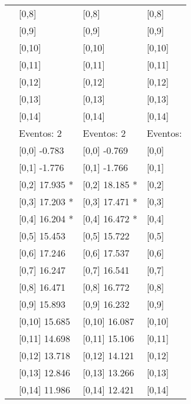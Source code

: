 \begin{table}
\begin{tabular}[t]{llll}
\addlinespace
 & {}[0,8] & {}[0,8] & {}[0,8]\\
 & {}[0,9] & {}[0,9] & {}[0,9]\\
 & {}[0,10] & {}[0,10] & {}[0,10]\\
 & {}[0,11] & {}[0,11] & {}[0,11]\\
 & {}[0,12] & {}[0,12] & {}[0,12]\\
\addlinespace
 & {}[0,13] & {}[0,13] & {}[0,13]\\
 & {}[0,14] & {}[0,14] & {}[0,14]\\
 & Eventos:  2 & Eventos:  2 & Eventos:\\
 & {}[0,0] -0.783 & {}[0,0] -0.769 & {}[0,0]\\
 & {}[0,1] -1.776 & {}[0,1] -1.766 & {}[0,1]\\
\addlinespace
 & {}[0,2] 17.935 * & {}[0,2] 18.185 * & {}[0,2]\\
 & {}[0,3] 17.203 * & {}[0,3] 17.471 * & {}[0,3]\\
 & {}[0,4] 16.204 * & {}[0,4] 16.472 * & {}[0,4]\\
 & {}[0,5] 15.453 & {}[0,5] 15.722 & {}[0,5]\\
 & {}[0,6] 17.246 & {}[0,6] 17.537 & {}[0,6]\\
\addlinespace
1000 & {}[0,7] 16.247 & {}[0,7] 16.541 & {}[0,7]\\
 & {}[0,8] 16.471 & {}[0,8] 16.772 & {}[0,8]\\
 & {}[0,9] 15.893 & {}[0,9] 16.232 & {}[0,9]\\
 & {}[0,10] 15.685 & {}[0,10] 16.087 & {}[0,10]\\
 & {}[0,11] 14.698 & {}[0,11] 15.106 & {}[0,11]\\
\addlinespace
 & {}[0,12] 13.718 & {}[0,12] 14.121 & {}[0,12]\\
 & {}[0,13] 12.846 & {}[0,13] 13.266 & {}[0,13]\\
 & {}[0,14] 11.986 & {}[0,14] 12.421 & {}[0,14]\\
\bottomrule
\end{tabular}
\end{table}

